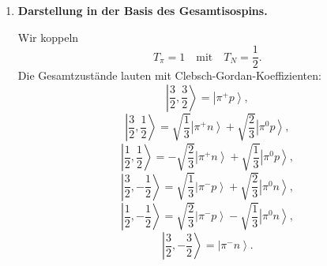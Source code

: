 \documentclass[11pt,a4paper]{scrartcl}
\newcommand{\ket}[1]{\left| #1 \right\rangle}
\theoremstyle{definition}
\theoremstyle{plain}
\theoremstyle{remark}
\begin{document}
\begin{enumerate}[label=(\alph*)]
    \begin{calculationbox}[title=Tabelle]
        \[
        \begin{array}{c|c|c}
        \text{Zustand} & T_3 & \text{m\"oglicher Gesamtisospin }T\\
        \hline
        \ket{\pi^+p} & +1+\frac12=+\frac32 & \frac32\\[0.2em]
        \ket{\pi^+n} & +1-\frac12=+\frac12 & \frac32,\frac12\\[0.2em]
        \ket{\pi^0p} & 0+\frac12=+\frac12 & \frac32,\frac12\\[0.2em]
        \ket{\pi^0n} & 0-\frac12=-\frac12 & \frac32,\frac12\\[0.2em]
        \ket{\pi^-p} & -1+\frac12=-\frac12 & \frac32,\frac12\\[0.2em]
        \ket{\pi^-n} & -1-\frac12=-\frac32 & \frac32
        \end{array}
        \]
    \end{calculationbox}

    \begin{answerbox}
        Die extremen Zustände
        \[
            \ket{\pi^+p},\qquad \ket{\pi^-n}
        \]
        sind reine $T=\frac32$-Zustände. Die Zustände mit
        \[
            T_3=\pm\frac12
        \]
        sind im Allgemeinen Linearkombinationen aus
        \[
            T=\frac32
            \quad\text{und}\quad
            T=\frac12.
        \]
    \end{answerbox}

    \item \textbf{Darstellung in der Basis des Gesamtisospins.}

    \begin{calculationbox}
        Wir koppeln
        \[
            T_\pi=1
            \quad\text{mit}\quad
            T_N=\frac12.
        \]
        Die Gesamtzustände lauten mit Clebsch-Gordan-Koeffizienten:
        \[
            \ket{\frac32,\frac32}
            =
            \ket{\pi^+p},
        \]
        \[
            \ket{\frac32,\frac12}
            =
            \sqrt{\frac13}\ket{\pi^+n}
            +
            \sqrt{\frac23}\ket{\pi^0p},
        \]
        \[
            \ket{\frac12,\frac12}
            =
            -\sqrt{\frac23}\ket{\pi^+n}
            +
            \sqrt{\frac13}\ket{\pi^0p},
        \]
        \[
            \ket{\frac32,-\frac12}
            =
            \sqrt{\frac13}\ket{\pi^-p}
            +
            \sqrt{\frac23}\ket{\pi^0n},
        \]
        \[
            \ket{\frac12,-\frac12}
            =
            \sqrt{\frac23}\ket{\pi^-p}
            -
            \sqrt{\frac13}\ket{\pi^0n},
        \]
        \[
            \ket{\frac32,-\frac32}
            =
            \ket{\pi^-n}.
        \]
    \end{calculationbox}


\end{enumerate}
\end{document}
